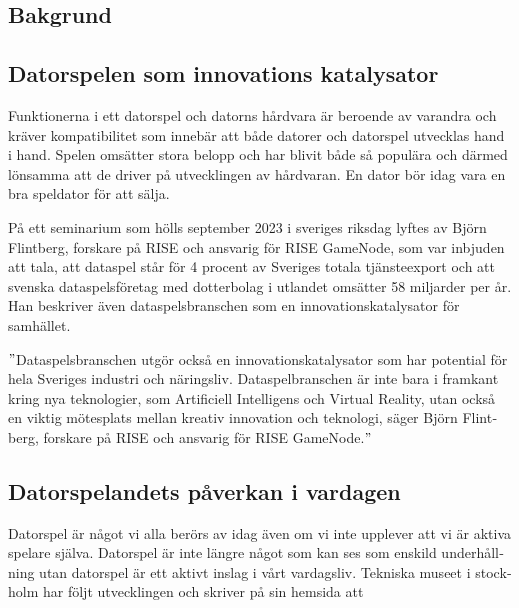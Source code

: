 \documentclass[11p]{article}
\begin{document}
\begin{otherlanguage}{swedish}
        \section{Bakgrund} %

        \subsection{Datorspelen som innovations katalysator}
        Funktionerna i ett datorspel och datorns hårdvara är beroende av varandra och kräver kompatibilitet som innebär att både datorer och datorspel utvecklas hand i hand.
        Spelen omsätter stora belopp och har blivit både så populära och därmed lönsamma att de driver på utvecklingen av hårdvaran.
        En dator bör idag vara en bra speldator för att sälja.

        På ett seminarium som hölls september 2023 i sveriges riksdag lyftes av  Björn Flintberg, forskare på RISE och ansvarig för RISE GameNode, som var inbjuden att tala, att dataspel står för 4 procent av Sveriges totala tjänsteexport och att svenska dataspelsföretag med dotterbolag i utlandet omsätter 58 miljarder per år.
        Han beskriver även dataspelsbranschen som en innovationskatalysator för samhället.


        \setlength{\leftskip}{1cm}
        \("\)Dataspelsbranschen utgör också en innovationskatalysator som har potential för hela Sveriges industri och näringsliv.
        Dataspelbranschen är inte bara i framkant kring nya teknologier, som Artificiell Intelligens och Virtual Reality, utan också en viktig mötesplats mellan kreativ innovation och teknologi, säger Björn Flintberg, forskare på RISE och ansvarig för RISE GameNode.\("\)\parencite{growth}


        \setlength{\leftskip}{0cm}

        \subsection{Datorspelandets påverkan i vardagen}

        Datorspel är något vi alla berörs av idag även om vi inte upplever att vi är aktiva spelare själva.
        Datorspel är inte längre något som kan ses som enskild underhållning utan datorspel är ett aktivt inslag i vårt vardagsliv.
        Tekniska museet i stockholm har följt utvecklingen och skriver på sin hemsida att


        \setlength{\leftskip}{1cm}


\end{otherlanguage}
\end{document}
